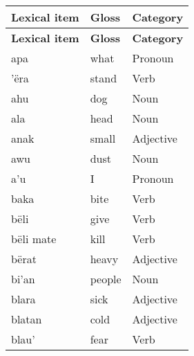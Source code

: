 \documentclass{article}
\begin{document}
\begin{longtable}{|l|l|l|}
\hline
\textbf{Lexical item}   & \textbf{Gloss}      & {\color[HTML]{009901} \textbf{Category}}           \\ \hline
\endfirsthead
\textbf{Lexical item}   & \textbf{Gloss}      & {\color[HTML]{009901} \textbf{Category}}           \\ \hline
\endhead
apa                     & what                & {\color[HTML]{009901} Pronoun}                     \\ \hline
'ëra                    & stand               & {\color[HTML]{009901} Verb}                        \\ \hline
ahu                     & dog                 & {\color[HTML]{009901} Noun}                        \\ \hline
ala                     & head                & {\color[HTML]{009901} Noun}                        \\ \hline
anak                    & small               & {\color[HTML]{009901} Adjective}                   \\ \hline
awu                     & dust                & {\color[HTML]{009901} Noun}                        \\ \hline
a'u                     & I                   & {\color[HTML]{009901} Pronoun}                     \\ \hline
baka                    & bite                & {\color[HTML]{009901} Verb}                        \\ \hline
bëli                    & give                & {\color[HTML]{009901} Verb}                        \\ \hline
bëli mate               & kill                & {\color[HTML]{009901} Verb}                        \\ \hline
bërat                   & heavy               & {\color[HTML]{009901} Adjective}                   \\ \hline
bi'an                   & people              & {\color[HTML]{009901} Noun}                        \\ \hline
blara                   & sick                & {\color[HTML]{009901} Adjective}                   \\ \hline
blatan                  & cold                & {\color[HTML]{009901} Adjective}                   \\ \hline
blau'                   & fear                & {\color[HTML]{009901} Verb}                        \\ \hline

\end{longtable}
\end{document}
